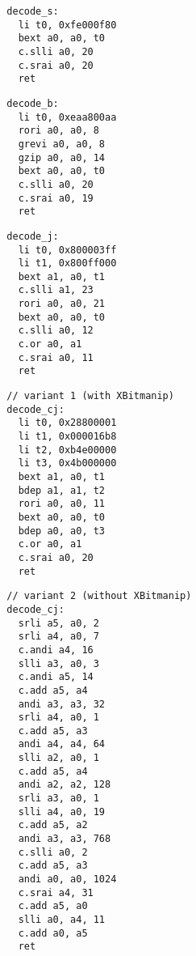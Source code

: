 \begin{multicols}{2}
\begin{minipage}{\linewidth}
\begin{verbatim}
  decode_s:
    li t0, 0xfe000f80
    bext a0, a0, t0
    c.slli a0, 20
    c.srai a0, 20
    ret
\end{verbatim}
\end{minipage}

\begin{minipage}{\linewidth}
\begin{verbatim}
  decode_b:
    li t0, 0xeaa800aa
    rori a0, a0, 8
    grevi a0, a0, 8
    gzip a0, a0, 14
    bext a0, a0, t0
    c.slli a0, 20
    c.srai a0, 19
    ret
\end{verbatim}
\end{minipage}

\begin{minipage}{\linewidth}
\begin{verbatim}
  decode_j:
    li t0, 0x800003ff
    li t1, 0x800ff000
    bext a1, a0, t1
    c.slli a1, 23
    rori a0, a0, 21
    bext a0, a0, t0
    c.slli a0, 12
    c.or a0, a1
    c.srai a0, 11
    ret
\end{verbatim}
\end{minipage}

\begin{minipage}{\linewidth}
\begin{verbatim}
  // variant 1 (with XBitmanip)
  decode_cj:
    li t0, 0x28800001
    li t1, 0x000016b8
    li t2, 0xb4e00000
    li t3, 0x4b000000
    bext a1, a0, t1
    bdep a1, a1, t2
    rori a0, a0, 11
    bext a0, a0, t0
    bdep a0, a0, t3
    c.or a0, a1
    c.srai a0, 20
    ret
\end{verbatim}
\end{minipage}

\begin{minipage}{\linewidth}
\begin{verbatim}
  // variant 2 (without XBitmanip)
  decode_cj:
    srli a5, a0, 2
    srli a4, a0, 7
    c.andi a4, 16
    slli a3, a0, 3
    c.andi a5, 14
    c.add a5, a4
    andi a3, a3, 32
    srli a4, a0, 1
    c.add a5, a3
    andi a4, a4, 64
    slli a2, a0, 1
    c.add a5, a4
    andi a2, a2, 128
    srli a3, a0, 1
    slli a4, a0, 19
    c.add a5, a2
    andi a3, a3, 768
    c.slli a0, 2
    c.add a5, a3
    andi a0, a0, 1024
    c.srai a4, 31
    c.add a5, a0
    slli a0, a4, 11
    c.add a0, a5
    ret
\end{verbatim}
\end{minipage}
\end{multicols}
